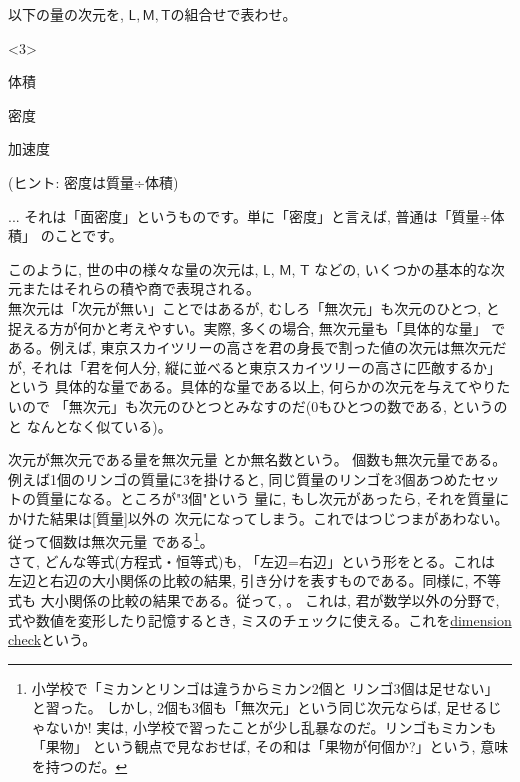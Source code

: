\begin{q}\label{q:alg_dim0}
 以下の量の次元を, $\mathsf{L}, \mathsf{M}, \mathsf{T}$の組合せで表わせ。
\begin{edaenumerate}<3>
\item 体積
\item 密度
\item 加速度
\end{edaenumerate}
(ヒント: 密度は質量÷体積)
\end{q}
\vspace{0.2cm}

\begin{freqmiss}{\small{} ... それは「面密度」というものです。単に「密度」と言えば, 普通は「質量÷体積」
のことです。}
\end{freqmiss}
\mv

このように, 世の中の様々な量の次元は, $\mathsf{L}$, $\mathsf{M}$, $\mathsf{T}$
などの, いくつかの基本的な次元またはそれらの積や商で表現される。\\


無次元は「次元が無い」ことではあるが, むしろ「無次元」も次元のひとつ, 
と捉える方が何かと考えやすい。実際, 多くの場合, 無次元量も「具体的な量」
である。例えば, 東京スカイツリーの高さを君の身長で割った値の次元は無次元だが, 
それは「君を何人分, 縦に並べると東京スカイツリーの高さに匹敵するか」という
具体的な量である。具体的な量である以上, 何らかの次元を与えてやりたいので
「無次元」も次元のひとつとみなすのだ(0もひとつの数である, というのと
なんとなく似ている)。

次元が無次元である量を無次元量
とか無名数という。
個数も無次元量である。例えば1個のリンゴの質量に3を掛けると, 
同じ質量のリンゴを3個あつめたセットの質量になる。ところが"3個"という
量に, もし次元があったら, それを質量にかけた結果は[質量]以外の
次元になってしまう。これではつじつまがあわない。従って個数は無次元量
である\footnote{小学校で「ミカンとリンゴは違うからミカン2個と
リンゴ3個は足せない」と習った。
しかし, 2個も3個も「無次元」という同じ次元ならば, 足せるじゃないか! 
実は, 小学校で習ったことが少し乱暴なのだ。リンゴもミカンも「果物」
という観点で見なおせば, その和は「果物が何個か?」という, 意味を持つのだ。}。\\

さて, どんな等式(方程式・恒等式)も, 「左辺=右辺」という形をとる。これは
左辺と右辺の大小関係の比較の結果, 引き分けを表すものである。同様に, 不等式も
大小関係の比較の結果である。従って, 。
これは, 君が数学以外の分野で, 式や数値を変形したり記憶するとき, 
ミスのチェックに使える。これを\underline{dimension check}という。

